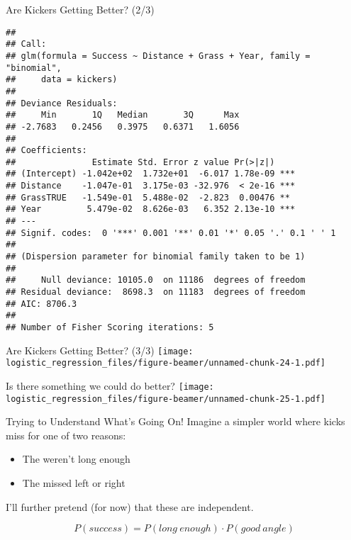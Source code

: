 \documentclass[
  ignorenonframetext,
]{beamer}
\begin{document}
\begin{frame}[fragile]{Are Kickers Getting Better? (2/3)}
\protect\hypertarget{are-kickers-getting-better-23}{}
\begin{verbatim}
## 
## Call:
## glm(formula = Success ~ Distance + Grass + Year, family = "binomial", 
##     data = kickers)
## 
## Deviance Residuals: 
##     Min       1Q   Median       3Q      Max  
## -2.7683   0.2456   0.3975   0.6371   1.6056  
## 
## Coefficients:
##               Estimate Std. Error z value Pr(>|z|)    
## (Intercept) -1.042e+02  1.732e+01  -6.017 1.78e-09 ***
## Distance    -1.047e-01  3.175e-03 -32.976  < 2e-16 ***
## GrassTRUE   -1.549e-01  5.488e-02  -2.823  0.00476 ** 
## Year         5.479e-02  8.626e-03   6.352 2.13e-10 ***
## ---
## Signif. codes:  0 '***' 0.001 '**' 0.01 '*' 0.05 '.' 0.1 ' ' 1
## 
## (Dispersion parameter for binomial family taken to be 1)
## 
##     Null deviance: 10105.0  on 11186  degrees of freedom
## Residual deviance:  8698.3  on 11183  degrees of freedom
## AIC: 8706.3
## 
## Number of Fisher Scoring iterations: 5
\end{verbatim}
\end{frame}

\begin{frame}{Are Kickers Getting Better? (3/3)}
\protect\hypertarget{are-kickers-getting-better-33}{}
\texttt{[image: logistic\_regression\_files/figure-beamer/unnamed-chunk-24-1.pdf]}
\end{frame}

\begin{frame}{Is there something we could do better?}
\protect\hypertarget{is-there-something-we-could-do-better}{}
\texttt{[image: logistic\_regression\_files/figure-beamer/unnamed-chunk-25-1.pdf]}
\end{frame}

\begin{frame}{Trying to Understand What's Going On!}
\protect\hypertarget{trying-to-understand-whats-going-on}{}
Imagine a simpler world where kicks miss for one of two reasons:

\begin{itemize}
\item
  The weren't long enough
\item
  The missed left or right
\end{itemize}

I'll further pretend (for now) that these are independent.

\[P(success) = P(long\ enough)\cdot P(good\ angle)\]
\end{frame}
\end{document}
